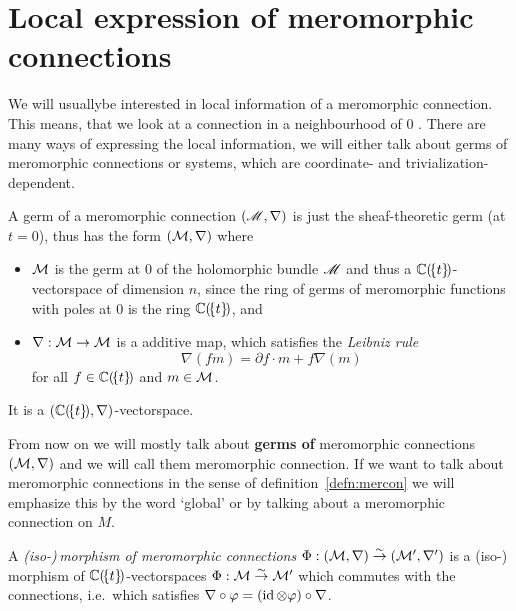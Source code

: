 \section{Local expression of meromorphic connections}
We will usually\TODO[only?] be interested in local information of a meromorphic
connection.  This means, that we look at a connection in a neighbourhood of $0$
.
There are many ways of expressing the local information, we will either talk
about germs of meromorphic connections or systems, which are coordinate-
and trivialization-dependent.
\begin{prop}
  A germ of a meromorphic connection $(\mathscr{M},\nabla)$ is just the sheaf-theoretic
  germ (at $t=0$), thus has the form $(\mathcal{M},\nabla)$ where
  \begin{itemize}
    \item $\mathcal{M}$ is the germ at $0$ of the holomorphic bundle $\mathscr{M}$ and thus a
      $\mathbb{C}(\!\{t\}\!)$-vectorspace of dimension $n$, since the ring of germs of
      meromorphic functions with poles at $0$ is the ring $\mathbb{C}(\!\{t\}\!)$, and
    \item $\nabla:\mathcal{M}\to \mathcal{M}$  is a additive map, which
      satisfies the \emph{Leibniz rule}
      \[
        \nabla(fm)=\partial f\cdot m + f\nabla(m)
      \]
      for all $f\in\mathbb{C}(\!\{t\}\!)$ and $m\in \mathcal{M}$.
  \end{itemize}
  \begin{s-rem}
    It is a $(\mathbb{C}(\!\{t\}\!),\nabla)$-vectorspace.
  \end{s-rem}
  \begin{comment}
    \begin{s-rem}
      Loday-Richaud calls this in \cite[Def.4.2.1]{Loday2014} a
      \emph{differential module}.
    \end{s-rem}
  \end{comment}
\end{prop}
\begin{rem}
  From now on we will mostly talk about \textbf{germs of} meromorphic
  connections $(\mathcal{M},\nabla)$ and we will call them meromorphic connection. If
  we want to talk about meromorphic connections in the sense of
  definition~\ref{defn:mercon} we will emphasize this by the word `global' or
  by talking about a meromorphic connection on $M$.
\end{rem}
\begin{defn}
  A \emph{(iso-)\,morphism of meromorphic connections}
  $\Phi:(\mathcal{M},\nabla)\overset{\sim}\to(\mathcal{M}',\nabla')$ is a (iso-)\,morphism of
  $\mathbb{C}(\!\{t\}\!)$-vectorspaces $\Phi:\mathcal{M}\overset{\sim}\to\mathcal{M}'$ which commutes
  with the connections, i.e.\ which satisfies
  $\nabla\circ\varphi = (\operatorname{id}\otimes\varphi)\circ\nabla$.
\end{defn}

